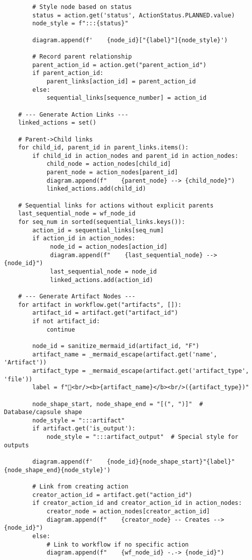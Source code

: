 \documentclass[12pt,a4paper]{article}
\begin{document}
\begin{pageablecode}
\begin{verbatim}
        # Style node based on status
        status = action.get('status', ActionStatus.PLANNED.value)
        node_style = f":::{status}"

        diagram.append(f'    {node_id}["{label}"]{node_style}')

        # Record parent relationship
        parent_action_id = action.get("parent_action_id")
        if parent_action_id:
            parent_links[action_id] = parent_action_id
        else:
            sequential_links[sequence_number] = action_id

    # --- Generate Action Links ---
    linked_actions = set()

    # Parent->Child links
    for child_id, parent_id in parent_links.items():
        if child_id in action_nodes and parent_id in action_nodes:
            child_node = action_nodes[child_id]
            parent_node = action_nodes[parent_id]
            diagram.append(f"    {parent_node} --> {child_node}")
            linked_actions.add(child_id)

    # Sequential links for actions without explicit parents
    last_sequential_node = wf_node_id
    for seq_num in sorted(sequential_links.keys()):
        action_id = sequential_links[seq_num]
        if action_id in action_nodes:
             node_id = action_nodes[action_id]
             diagram.append(f"    {last_sequential_node} --> {node_id}")
             last_sequential_node = node_id
             linked_actions.add(action_id)

    # --- Generate Artifact Nodes ---
    for artifact in workflow.get("artifacts", []):
        artifact_id = artifact.get("artifact_id")
        if not artifact_id:
            continue

        node_id = sanitize_mermaid_id(artifact_id, "F")
        artifact_name = _mermaid_escape(artifact.get('name', 'Artifact'))
        artifact_type = _mermaid_escape(artifact.get('artifact_type', 'file'))
        label = f"📄<br/><b>{artifact_name}</b><br/>({artifact_type})"

        node_shape_start, node_shape_end = "[(", ")]"  # Database/capsule shape
        node_style = ":::artifact"
        if artifact.get('is_output'):
            node_style = ":::artifact_output"  # Special style for outputs

        diagram.append(f'    {node_id}{node_shape_start}"{label}"{node_shape_end}{node_style}')

        # Link from creating action
        creator_action_id = artifact.get("action_id")
        if creator_action_id and creator_action_id in action_nodes:
            creator_node = action_nodes[creator_action_id]
            diagram.append(f"    {creator_node} -- Creates --> {node_id}")
        else:
            # Link to workflow if no specific action
            diagram.append(f"    {wf_node_id} -.-> {node_id}")


\end{verbatim}
\end{pageablecode}
\end{document}
